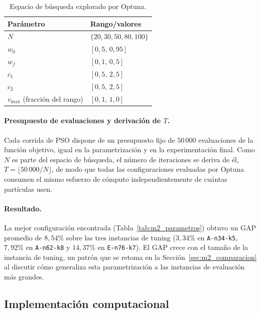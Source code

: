 \begin{table}[H]
\centering
\caption{Espacio de búsqueda explorado por Optuna.}
\label{tab:m2_espacio_busqueda}
\begin{tabular}{ll}
\hline
Parámetro & Rango/valores \\
\hline
$N$          & $\{20, 30, 50, 80, 100\}$ \\
$w_0$        & $[0{,}5,\, 0{,}95]$ \\
$w_f$        & $[0{,}1,\, 0{,}5]$ \\
$c_1$        & $[0{,}5,\, 2{,}5]$ \\
$c_2$        & $[0{,}5,\, 2{,}5]$ \\
$v_{\max}$ (fracción del rango) & $[0{,}1,\, 1{,}0]$ \\
\hline
\end{tabular}
\end{table}

\paragraph{Presupuesto de evaluaciones y derivación de $T$.} Cada corrida de PSO dispone
de un presupuesto fijo de $50\,000$ evaluaciones de la función objetivo, igual en la
parametrización y en la experimentación final. Como $N$ es parte del espacio de búsqueda,
el número de iteraciones se deriva de él, $T = \lfloor 50\,000/N \rfloor$, de modo que
todas las configuraciones evaluadas por Optuna consumen el mismo esfuerzo de cómputo
independientemente de cuántas partículas usen.

\paragraph{Resultado.} La mejor configuración encontrada (Tabla~\ref{tab:m2_parametros})
obtuvo un GAP promedio de $8{,}54\%$ sobre las tres instancias de tuning
($3{,}34\%$ en \texttt{A-n34-k5}, $7{,}92\%$ en \texttt{A-n62-k8} y $14{,}37\%$ en
\texttt{E-n76-k7}). El GAP crece con el tamaño de la instancia de tuning, un patrón que
se retoma en la Sección~\ref{sec:m2_comparacion} al discutir cómo generaliza esta
parametrización a las instancias de evaluación más grandes.

\subsection{Implementación computacional}

